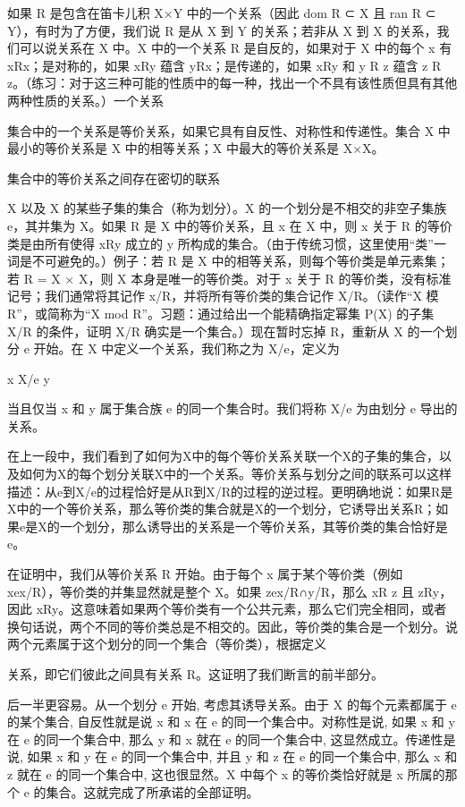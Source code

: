 \documentclass[12pt,a4paper]{ctexbook}
\theoremstyle{definition}
\theoremstyle{remark}
\begin{document}
如果 R 是包含在笛卡儿积 X×Y 中的一个关系（因此 dom R ⊂ X 且 ran R ⊂ Y），有时为了方便，我们说 R 是从 X 到 Y 的关系；若非从 X 到 X 的关系，我们可以说关系在 X 中。X 中的一个关系 R 是自反的，如果对于 X 中的每个 x 有 xRx；是对称的，如果 xRy 蕴含 yRx；是传递的，如果 xRy 和 y R z 蕴含 z R z。（练习：对于这三种可能的性质中的每一种，找出一个不具有该性质但具有其他两种性质的关系。）一个关系

集合中的一个关系是等价关系，如果它具有自反性、对称性和传递性。集合 X 中最小的等价关系是 X 中的相等关系；X 中最大的等价关系是 X×X。

集合中的等价关系之间存在密切的联系

X 以及 X 的某些子集的集合（称为划分）。X 的一个划分是不相交的非空子集族 e，其并集为 X。如果 R 是 X 中的等价关系，且 x 在 X 中，则 x 关于 R 的等价类是由所有使得 xRy 成立的 y 所构成的集合。（由于传统习惯，这里使用“类”一词是不可避免的。）例子：若 R 是 X 中的相等关系，则每个等价类是单元素集；若 R = X × X，则 X 本身是唯一的等价类。对于 x 关于 R 的等价类，没有标准记号；我们通常将其记作 x/R，并将所有等价类的集合记作 X/R。（读作“X 模 R”，或简称为“X mod R”。习题：通过给出一个能精确指定幂集 P(X) 的子集 X/R 的条件，证明 X/R 确实是一个集合。）现在暂时忘掉 R，重新从 X 的一个划分 e 开始。在 X 中定义一个关系，我们称之为 X/e，定义为

x X/e y

当且仅当 x 和 y 属于集合族 e 的同一个集合时。我们将称 X/e 为由划分 e 导出的关系。

在上一段中，我们看到了如何为X中的每个等价关系关联一个X的子集的集合，以及如何为X的每个划分关联X中的一个关系。等价关系与划分之间的联系可以这样描述：从e到X/e的过程恰好是从R到X/R的过程的逆过程。更明确地说：如果R是X中的一个等价关系，那么等价类的集合就是X的一个划分，它诱导出关系R；如果e是X的一个划分，那么诱导出的关系是一个等价关系，其等价类的集合恰好是e。

在证明中，我们从等价关系 R 开始。由于每个 x 属于某个等价类（例如 xex/R），等价类的并集显然就是整个 X。如果 zex/R∩y/R，那么 xR z 且 zRy，因此 xRy。这意味着如果两个等价类有一个公共元素，那么它们完全相同，或者换句话说，两个不同的等价类总是不相交的。因此，等价类的集合是一个划分。说两个元素属于这个划分的同一个集合（等价类），根据定义

关系，即它们彼此之间具有关系 R。这证明了我们断言的前半部分。

后一半更容易。从一个划分 e 开始, 考虑其诱导关系。由于 X 的每个元素都属于 e 的某个集合, 自反性就是说 x 和 x 在 e 的同一个集合中。对称性是说, 如果 x 和 y 在 e 的同一个集合中, 那么 y 和 x 就在 e 的同一个集合中, 这显然成立。传递性是说, 如果 x 和 y 在 e 的同一个集合中, 并且 y 和 z 在 e 的同一个集合中, 那么 x 和 z 就在 e 的同一个集合中, 这也很显然。X 中每个 x 的等价类恰好就是 x 所属的那个 e 的集合。这就完成了所承诺的全部证明。
\end{document}
